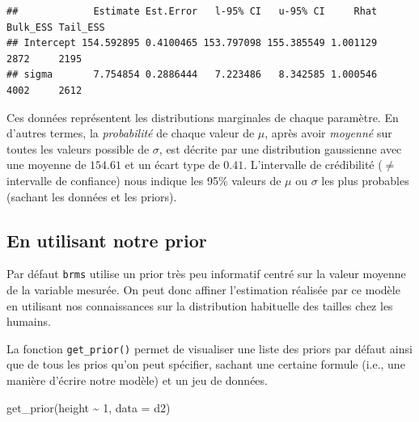 \documentclass[
  a4paper,11pt,twoside,onecolumn,openright,final,oldfontcommands]{memoir}
\newenvironment{Shaded}{\begin{snugshade}}{\end{snugshade}}
\newcommand{\AttributeTok}[1]{\textcolor[rgb]{0.77,0.63,0.00}{#1}}
\newcommand{\DecValTok}[1]{\textcolor[rgb]{0.00,0.00,0.81}{#1}}
\newcommand{\FunctionTok}[1]{\textcolor[rgb]{0.00,0.00,0.00}{#1}}
\newcommand{\NormalTok}[1]{#1}
\newcommand{\SpecialCharTok}[1]{\textcolor[rgb]{0.00,0.00,0.00}{#1}}
\theoremstyle{definition}
\theoremstyle{definition}
\theoremstyle{definition}
\theoremstyle{remark}
\begin{document}
\begin{Shaded}
\end{Shaded}

\begin{verbatim}
##             Estimate Est.Error   l-95% CI   u-95% CI     Rhat Bulk_ESS Tail_ESS
## Intercept 154.592895 0.4100465 153.797098 155.385549 1.001129     2872     2195
## sigma       7.754854 0.2886444   7.223486   8.342585 1.000546     4002     2612
\end{verbatim}

Ces données représentent les distributions marginales de chaque paramètre. En d'autres termes, la \emph{probabilité} de chaque valeur de \(\mu\), après avoir \emph{moyenné} sur toutes les valeurs possible de \(\sigma\), est décrite par une distribution gaussienne avec une moyenne de \(154.61\) et un écart type de \(0.41\). L'intervalle de crédibilité (\(\neq\) intervalle de confiance) nous indique les 95\% valeurs de \(\mu\) ou \(\sigma\) les plus probables (sachant les données et les priors).

\hypertarget{en-utilisant-notre-prior}{%
\subsection{En utilisant notre prior}\label{en-utilisant-notre-prior}}

Par défaut \texttt{brms} utilise un prior très peu informatif centré sur la valeur moyenne de la variable mesurée. On peut donc affiner l'estimation réalisée par ce modèle en utilisant nos connaissances sur la distribution habituelle des tailles chez les humains.

La fonction \texttt{get\_prior()} permet de visualiser une liste des priors par défaut ainsi que de tous les prios qu'on peut spécifier, sachant une certaine formule (i.e., une manière d'écrire notre modèle) et un jeu de données.

\begin{Shaded}
\begin{Highlighting}[]
\FunctionTok{get\_prior}\NormalTok{(height }\SpecialCharTok{\textasciitilde{}} \DecValTok{1}\NormalTok{, }\AttributeTok{data =}\NormalTok{ d2)}
\end{Highlighting}
\end{Shaded}
\end{document}
